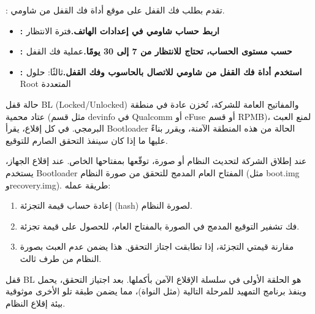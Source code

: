 


: تقدم بطلب فك القفل على موقع أداة فك القفل من شاومي.


\begin{itemize}
  \item \textbf{: اربط حساب شاومي في إعدادات الهاتف.}فترة الانتظار
  \item \textbf{: حسب مستوى الحساب، تحتاج للانتظار من 7 إلى 30 يومًا.}عملية فك القفل
  \item \textbf{: استخدم أداة فك القفل من شاومي للاتصال بالحاسوب وفك القفل.}ثالثًا: حلول Root المتعددة
\end{itemize}


حالة قفل BL (Locked/Unlocked) والمفاتيح العامة للشركة، تُخزن عادة في منطقة عتاد محمية (مثل قسم devinfo في Qualcomm أو eFuse أو قسم RPMB)، لمنع العبث البرمجي. في كل إقلاع، يقرأ Bootloader الحالة من هذه المنطقة الآمنة، ويقرر بناءً عليها ما إذا كان سينفذ التحقق الصارم للتوقيع.


عند إطلاق الشركة لتحديث النظام أو صورة، توقّعها بمفتاحها الخاص. عند إقلاع الجهاز، يستخدم Bootloader المفتاح العام المدمج للتحقق من صورة النظام (مثل boot.img وrecovery.img). طريقة عمله:

\begin{enumerate}
  \item إعادة حساب قيمة التجزئة (hash) لصورة النظام.
  \item فك تشفير التوقيع المدمج في الصورة بالمفتاح العام، للحصول على قيمة تجزئة.
  \item مقارنة قيمتي التجزئة، إذا تطابقت اجتاز التحقق. هذا يضمن عدم العبث بصورة النظام من طرف ثالث.
\end{enumerate}


قفل BL هو الحلقة الأولى في سلسلة الإقلاع الآمن بأكملها. بعد اجتياز التحقق، يحمل وينفذ برنامج التمهيد للمرحلة التالية (مثل النواة)، مما يضمن طبقة تلو الأخرى موثوقية بيئة إقلاع النظام.


